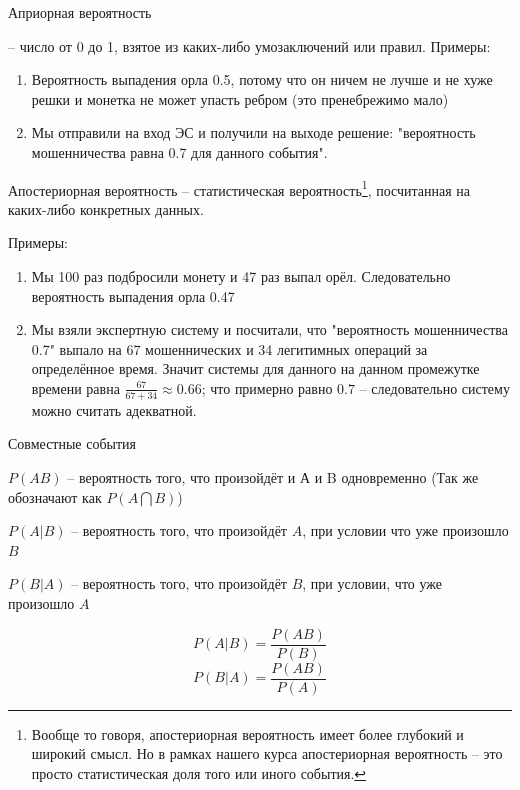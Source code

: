 \begin{frame}{Априорная вероятность}
	
	 -- число от 0 до 1, взятое из каких-либо умозаключений или правил.
	Примеры:
	\begin{enumerate}
		\item Вероятность выпадения орла 0.5, потому что он ничем не лучше и не хуже решки и монетка не может упасть ребром (это пренебрежимо мало)
		\item Мы отправили  на вход ЭС и получили на выходе решение: "вероятность мошенничества равна 0.7 для данного события".
	\end{enumerate}
	
\end{frame}

\begin{frame}{Апостериорная вероятность}
	\small
	 -- статистическая вероятность\footnote{
		Вообще то говоря, апостериорная вероятность имеет более глубокий и широкий смысл.
		Но в рамках нашего курса апостериорная вероятность -- это просто статистическая доля того или иного события.}, посчитанная на каких-либо конкретных данных.
	
	Примеры: \small
	\begin{enumerate}
		\item Мы 100 раз подбросили монету и 47 раз выпал орёл. Следовательно 
		вероятность выпадения орла 0.47
		\item Мы взяли экспертную систему и посчитали, что  "вероятность мошенничества 0.7"
		выпало на 67 мошеннических и 34 легитимных операций за определённое время. 
		Значит  системы для данного  на данном промежутке времени равна $\frac{67}{67+34} \approx 0.66$; что примерно равно $0.7$ -- следовательно систему можно считать адекватной.
	\end{enumerate}
\end{frame}

\begin{frame}{Совместные события}
\small

$P(AB)$ -- вероятность того, что произойдёт и А и B одновременно
(Так же обозначают как $P(A\bigcap B)$)


$P(A|B)$ -- вероятность того, что произойдёт $A$, при условии что уже произошло $B$

$P(B|A)$ -- вероятность того, что произойдёт $B$, при условии, что уже произошло $A$

\begin{equation}\label{eq:P_A_by_B}
P(A|B) = \frac{P(AB)}{P(B)}
\end{equation}
\begin{equation}\label{eq:P_B_by_A}
P(B|A) = \frac{P(AB)}{P(A)}
\end{equation}

	
\end{frame}

